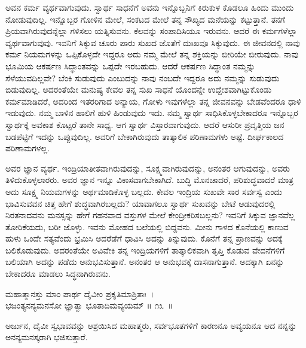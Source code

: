 ಅವನ ಕರ್ಮ ವ್ಯರ್ಥವಾಗುವುದು. ಸ್ವಾರ್ಥ ಸಾಧನೆಗೆ ಅವನು ಇನ್ನೊಬ್ಬನಿಗೆ ಕಿರುಕುಳ ಕೊಡಲೂ ಹಿಂದು ಮುಂದು ನೋಡುವುದಿಲ್ಲ. ಇನ್ನೊಬ್ಬರ ಗೋಳಿನ ಮೇಲೆ, ಸಂಕಟದ ಮೇಲೆ ತನ್ನ ಸೌಖ್ಯದ ಮನೆಯನ್ನು ಕಟ್ಟುತ್ತಾನೆ. ತನಗೆ ಪ್ರಿಯವಾಗಿರುವುದನ್ನೆಲ್ಲಾ ಗಳಿಸಲು ಯತ್ನಿಸುವನು. ಕೆಲವನ್ನು ಸಂಪಾದಿಸಿಯೂ ಇರುವನು. ಆದರೆ ಈ ಕರ್ಮಗಳೆಲ್ಲಾ ವ್ಯರ್ಥ\-ವಾಗುವುವು. ಇವನಿಗೆ ಸಿಕ್ಕುವ ಚೂರು ಪಾರು ಸುಖದ ಜೊತೆಗೆ ದುಃಖವೂ ಸಿಕ್ಕುವುದು. ಈ ಜೀವನದಲ್ಲಿ ನಾವು ಕರ್ಮ ನಿಯಮಗಳನ್ನು ಒಪ್ಪಿಕೊಳ್ಳದೇ ಇದ್ದರೂ ಅದು ನಮ್ಮ ಮೇಲೆ ತನ್ನ ಶಕ್ತಿಯನ್ನು ಬೀರಿಯೇ ಬೀರುವುದು. ನಾವು ಭೂಮಿಯ ಆಕರ್ಷಣ ಸಿದ್ಧಾಂತವನ್ನು ಒಪ್ಪದೇ ಇರಬಹುದು. ಆದರೆ ಆಕರ್ಷಣ ಸಿದ್ಧಾಂತ ನಮ್ಮನ್ನು ಸೆಳೆಯುವದಿಲ್ಲವೇ? ಬೆಂಕಿ ಸುಡುವುದು ಎಂಬುದನ್ನು ನಾವು ನಂಬದೇ ಇದ್ದರೂ ಅದು ನಮ್ಮನ್ನು ಸುಡುವುದು ಬಿಡುವುದಿಲ್ಲ. ಅದರಂತೆಯೇ ಮನುಷ್ಯ ಕೇವಲ ತನ್ನ ಸುಖ ಸಾಧನೆ ಯೊಂದನ್ನೇ ಉದ್ದೇಶವಾಗಿಟ್ಟುಕೊಂಡು ಕರ್ಮಮಾಡಿದರೆ, ಅದರಿಂದ ಇತರರಿಗಾದ ಅನ್ಯಾಯ, ಗೋಳು ಇವುಗಳೆಲ್ಲಾ ತನ್ನ ಜೀವನವನ್ನು ಬೇಡವೆಂದರೂ ಧಾಳಿ ಇಡುವುದು. ನಮ್ಮ ಬಾಳಿನ ಹಾಲಿಗೆ ಹುಳಿ ಹಿಂಡುವುದು ಇದು. ನಮ್ಮ ಸ್ವಾರ್ಥ ಸಾಧಿಸಿಕೊಳ್ಳಬೇಕಾದರೂ ಇನ್ನೊಬ್ಬರ ಸ್ವಾರ್ಥಕ್ಕೆ ಅವಕಾಶ ಕೊಟ್ಟರೆ ತಾನೇ ಸಾಧ್ಯ. ಆಗ ಸ್ವಾರ್ಥ ವಿಸ್ತಾರವಾಗುವುದು. ಆದರೆ ಆಸುರೀ ಪ್ರವೃತ್ತಿಯ ಜನ ಬಡಪೆಟ್ಟಿಗೆ ಇದನ್ನು ಒಪ್ಪುವುದಿಲ್ಲ. ಅವರಿಗೆ ಬೇಕಾಗಿರುವುದು ತಾತ್ಕಾಲಿಕ ಪರಿಣಾಮಗಳು ಅಷ್ಟೆ. ದೀರ್ಘಕಾಲದ ಪರಿಣಾಮಗಳಲ್ಲ.

ಅವರ ಜ್ಞಾನ ವ್ಯರ್ಥ. ಇಂದ್ರಿಯಾತೀತವಾಗಿರುವುದನ್ನು, ಸೂಕ್ಷ್ಮವಾಗಿರುವುದನ್ನು, ಅನಂತರ ಆಗುವುದನ್ನು, ಅವರು ತಿಳಿದುಕೊಳ್ಳಲಾರರು. ಅವರ ಜ್ಞಾನ ಇನ್ನೂ ವಿಕಾಸವಾಗಬೇಕಾಗಿದೆ. ಬುದ್ಧಿ ಮೊನಚಾದರೆ, ಪರಿಶುದ್ಧವಾದರೆ ಮಾತ್ರ ಅದು ಸೂಕ್ಷ್ಮ ನಿಯಮಗಳನ್ನು ಅರ್ಥಮಾಡಿಕೊಳ್ಳ ಬಲ್ಲದು. ಕೇವಲ ಇಂದ್ರಿಯ ಸುಖವೇ ಸಾರ ಸರ್ವಸ್ವ ಎಂದು ಭಾವಿಸುವವನ ಚಿತ್ತ ಹೇಗೆ ಶುದ್ಧವಾಗಿರಬಲ್ಲದು? ಯಾವಾಗಲೂ ಸ್ವಾರ್ಥ ಸುಖವನ್ನು ಬೇಟೆ ಆಡುವುದರಲ್ಲಿ ನಿರತನಾದವನು ಮನಸ್ಸನ್ನು ಹೇಗೆ ಗಹನವಾದ ವಸ್ತುಗಳ ಮೇಲೆ ಕೇಂದ್ರೀಕರಿಸಬಲ್ಲನು? ಇವನಿಗೆ ಸಿಕ್ಕುವ ಜ್ಞಾನವೆಲ್ಲ ತೋರಿಕೆಯದು, ಬರೀ ಜೊಳ್ಳು. ಇವನು ಮೋಹದ ಬಲೆಯಲ್ಲಿ ಬಿದ್ದವನು. ಮೀನು ಗಾಳದ ಕೊನೆಯಲ್ಲಿ ಕಾಣುವ ಹುಳು ಒಂದೇ ಸತ್ಯವೆಂದು ಭ್ರಮಿಸಿ ಅದರೆಡೆಗೆ ಧಾವಿಸಿ ಅದನ್ನು ತಿನ್ನುವುದು. ಕೊನೆಗೆ ತನ್ನ ಪ್ರಾಣವನ್ನು ಅದಕ್ಕೆ ಬಲಿಕೊಡುವುದು. ಅದರಂತೆಯೇ ಅವಿವೇಕಿ ತನ್ನ ಇಂದ್ರಿಯಗಳಿಗೆ ತಾತ್ಕಾಲಿಕವಾಗಿ ತೃಪ್ತಿ ಕೊಡುವ ವೇದನೆಗಳಿಗೆ ಬಲಿಯಾಗಿ ಅದನ್ನು ಪಡೆದು ಅನುಭವಿಸುತ್ತಾನೆ. ಅನಂತರ ಆ ಅನುಭವಕ್ಕೆ ದಾಸನಾಗುತ್ತಾನೆ. ಅದಕ್ಕಾಗಿ ಏನನ್ನು ಬೇಕಾದರೂ ಮಾಡಲು ಸಿದ್ಧನಾಗಿರುವನು.

\begin{shloka}
ಮಹಾತ್ಮಾನಸ್ತು ಮಾಂ ಪಾರ್ಥ ದೈವೀಂ ಪ್ರಕೃತಿಮಾಶ್ರಿತಾಃ~।\\ಭಜಂತ್ಯನನ್ಯಮನಸೋ ಜ್ಞಾತ್ವಾ ಭೂತಾದಿಮವ್ಯಯಮ್ \hfill॥ ೧೩~॥
\end{shloka}

\begin{artha}
ಅರ್ಜುನ, ದೈವೀ ಸ್ವಭಾವವನ್ನು ಆಶ್ರಯಿಸಿದ ಮಹಾತ್ಮರು, ಸರ್ವಭೂತಗಳಿಗೆ ಕಾರಣನೂ ಅವ್ಯಯನೂ ಆದ ನನ್ನನ್ನು ಅನನ್ಯಮನಸ್ಕರಾಗಿ ಭಜಿಸುತ್ತಾರೆ.
\end{artha}

